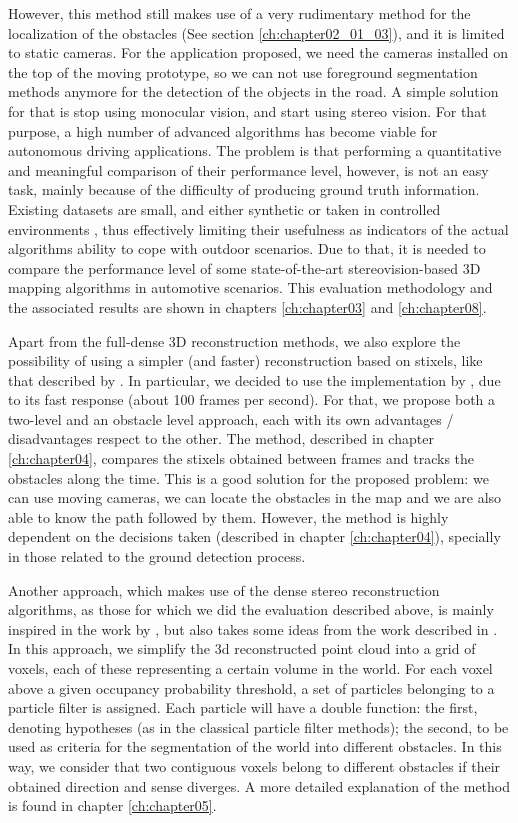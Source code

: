 However, this method still makes use of a very rudimentary method for the localization of the obstacles (See section \ref{ch:chapter02_01_03}), and it is limited to static cameras. For the application proposed, we need the cameras installed on the top of the moving prototype, so we can not use foreground segmentation methods anymore for the detection of the objects in the road. A simple solution for that is stop using monocular vision, and start using stereo vision. For that purpose, a high number of advanced algorithms has become viable for autonomous driving applications. The problem is that performing a quantitative and meaningful comparison of their performance level, however, is not an easy task, mainly because of the difficulty of producing ground truth information. Existing datasets are small, and either synthetic or taken in controlled environments \citep{Scharstein2002}, thus effectively limiting their usefulness as indicators of the actual algorithms ability to cope with outdoor scenarios. Due to that, it is needed to compare the performance level of some state-of-the-art stereovision-based 3D mapping algorithms in automotive scenarios. This evaluation methodology and the associated results are shown in chapters \ref{ch:chapter03} and \ref{ch:chapter08}.

Apart from the full-dense 3D reconstruction methods, we also explore the possibility of using a simpler (and faster) reconstruction based on stixels, like that described by \cite{badino2009stixel}. In particular, we decided to use the implementation by \cite{benenson2012pedestrian}, due to its fast response (about 100 frames per second). For that, we propose both a two-level and an obstacle level approach, each with its own advantages / disadvantages respect to the other. The method, described in chapter \ref{ch:chapter04}, compares the stixels obtained between frames and tracks the obstacles along the time. This is a good solution for the proposed problem: we can use moving cameras, we can locate the obstacles in the map and we are also able to know the path followed by them. However, the method is highly dependent on the decisions taken (described in chapter \ref{ch:chapter04}), specially in those related to the ground detection process.

Another approach, which makes use of the dense stereo reconstruction algorithms, as those for which we did the evaluation described above, is mainly inspired in the work by \cite{danescu2012particle}, but also takes some ideas from the work described in \cite{broggi2013}. In this approach, we simplify the 3d reconstructed point cloud into a grid of voxels, each of these representing a certain volume in the world. For each voxel above a given occupancy probability threshold, a set of particles belonging to a particle filter is assigned. Each particle will have a double function: the first, denoting hypotheses (as in the classical particle filter methods); the second, to be used as criteria for the segmentation of the world into different obstacles. In this way, we consider that two contiguous voxels belong to different obstacles if their obtained direction and sense diverges. A more detailed explanation of the method is found in chapter \ref{ch:chapter05}.

